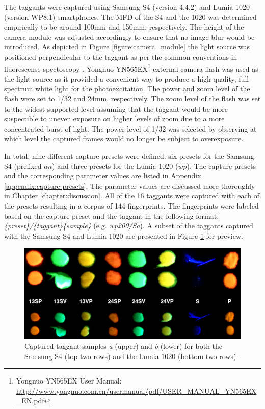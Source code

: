 \documentclass[thesis.tex]{subfiles}
\begin{document}
The taggants were captured using Samsung S4 (version 4.4.2) and Lumia 1020 (version WP8.1) smartphones. The MFD of the S4 and the 1020 was determined empirically to be around 100mm and 150mm, respectively. The height of the camera module was adjusted accordingly to ensure that no image blur would be introduced. As depicted in Figure \ref{figure:camera_module} the light source was positioned perpendicular to the taggant as per the common conventions in fluorescense spectoscopy \cite{spectroscopy-principles}. Yongnuo YN565EX\footnote{Yongnuo YN565EX User Manual: \url{http://www.yongnuo.com.cn/usermanual/pdf/USER_MANUAL_YN565EX_EN.pdf}} external camera flash was used as the light source as it provided a convenient way to produce a high quality, full-spectrum white light for the photoexcitation. The power and zoom level of the flash were set to 1/32 and 24mm, respectively. The zoom level of the flash was set to the widest supported level assuming that the taggant would be more suspectible to uneven exposure on higher levels of zoom due to a more concentrated burst of light. The power level of 1/32 was selected by observing at which level the captured frames would no longer be subject to overexposure.

In total, nine different capture presets were defined: six presets for the Samsung S4 (prefixed $an$) and three presets for the Lumia 1020 ($wp$). The capture presets and the corresponding parameter values are listed in Appendix \ref{appendix:capture-presets}. The parameter values are discussed more thoroughly in Chapter \ref{chapter:discussion}. All of the 16 taggants were captured with each of the presets resulting in a corpus of 144 fingerprints. The fingerprints were labeled based on the capture preset and the taggant in the following format: \emph{\{preset\}/\{taggant\}\{sample\}} (e.g. \emph{wp200/Sa}). A subset of the taggants captured with the Samsung S4 and Lumia 1020 are presented in Figure \ref{figure:taggants} for preview.

\begin{figure}[h]
\label{figure:taggants}
\centering \includegraphics[width=\textwidth,height=\textheight,keepaspectratio=true]{images/experiment/taggants}
\caption{Captured taggant samples \emph{a} (upper) and \emph{b} (lower) for both the Samsung S4 (top two rows) and the Lumia 1020 (bottom two rows).}
\end{figure}
\clearpage
\end{document}

